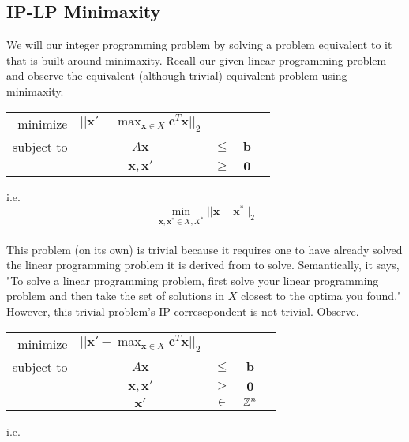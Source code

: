 \documentclass[conference]{IEEEtran}
\numberwithin{equation}{section}
\numberwithin{figure}{section}
\theoremstyle{plain}
\theoremstyle{definition}
\newcommand{\Z}{\ensuremath \mathbb{Z}}
\newcommand{\1}{\ensuremath \mathbbm{1}}
\begin{document}
\subsection{IP-LP Minimaxity}
We will our integer programming problem by solving a problem equivalent to it 
that is built around minimaxity. Recall our given linear programming problem and 
observe the equivalent (although trivial) equivalent problem using minimaxity. \\
\begin{center}\begin{tabular}{rcccc}
minimize   & $||\mathbf{x}' - \max_{\mathbf{x} \in X}\mathbf{c}^T\mathbf{x}||_2$ &        &                       \\
subject to & $A\mathbf{x}$                                                       & $\leq$ & $\mathbf{b}$ \\
           & $\mathbf{x},\mathbf{x}'$                                            & $\geq$ & $\mathbf{0}$ \\
\end{tabular}\end{center}
i.e. \\
\[\min_{\mathbf{x},\mathbf{x}^* \in X,X^*}||\mathbf{x} - \mathbf{x}^*||_2\] \\
This problem (on its own) is trivial because it requires one to have already 
solved the linear programming problem it is derived from to solve. Semantically, 
it says, "To solve a linear programming problem, first solve your linear 
programming problem and then take the set of solutions in $X$ closest to the 
optima you found." However, this trivial problem's IP corresepondent is not 
trivial. Observe. \\
\begin{center}\begin{tabular}{rcccc}
minimize   & $||\mathbf{x}' - \max_{\mathbf{x} \in X}\mathbf{c}^T\mathbf{x}||_2$ &        &              \\
subject to & $A\mathbf{x}$                                                       & $\leq$ & $\mathbf{b}$ \\
           & $\mathbf{x},\mathbf{x}'$                                            & $\geq$ & $\mathbf{0}$ \\
           & $\mathbf{x}'$                                                       & $\in$  & $\Z^n$       \\
\end{tabular}\end{center}
i.e. \\
\end{document}
